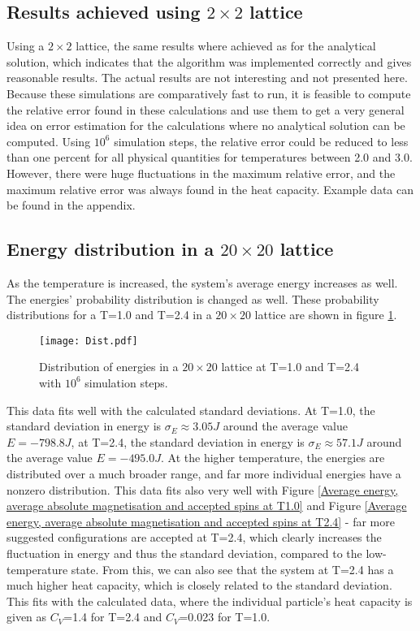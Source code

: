 \documentclass[10pt,a4paper]{article}
\begin{document}
\subsection{Results achieved using $2\times2$ lattice}
Using a $2\times2$ lattice, the same results where achieved as for the analytical solution, which indicates that the algorithm was implemented correctly and gives reasonable results. The actual results are not interesting and not presented here. Because these simulations are comparatively fast to run, it is feasible to compute the relative error found in these calculations and use them to get a very general idea on error estimation for the calculations where no analytical solution can be computed.
Using $10^6$ simulation steps, the relative error could be reduced to less than one percent for all physical quantities for temperatures between 2.0 and 3.0. However, there were huge fluctuations in the maximum relative error, and the maximum relative error was always found in the heat capacity. Example data can be found in the appendix.
\subsection{Energy distribution in a $20\times20$ lattice}
As the temperature is increased, the system's average energy increases as well. The energies' probability distribution is changed as well. These probability distributions for a T=1.0 and T=2.4 in a $20\times20$ lattice are shown in figure \ref{Energy probability distributions in a 20x20 lattice at T1.0  T2.4}.
\begin{figure}[H]
\texttt{[image: Dist.pdf]}
\caption[Energy probability distributions in a $20\times20$ lattice at T=1.0 \& T=2.4]{Distribution of energies in a $20\times20$ lattice at T=1.0 and T=2.4 with $10^6$ simulation steps.}\label{Energy probability distributions in a 20x20 lattice at T1.0  T2.4}
\end{figure}
This data fits well with the calculated standard deviations. At T=1.0, the standard deviation in energy is $\sigma_E\approx3.05J$ around the average value $E=-798.8J$, at T=2.4, the standard deviation in energy is $\sigma_E\approx57.1J$ around the average value $E=-495.0J$. At the higher temperature, the energies are distributed over a much broader range, and far more individual energies have a nonzero distribution. This data fits also very well with Figure \ref{Average energy, average absolute magnetisation and accepted spins at T1.0} and Figure \ref{Average energy, average absolute magnetisation and accepted spins at T2.4} - far more suggested configurations are accepted at T=2.4, which clearly increases the fluctuation in energy and thus the standard deviation, compared to the low-temperature state. From this, we can also see that the system at T=2.4 has a much higher heat capacity, which is closely related to the standard deviation. This fits with the calculated data, where the individual particle's heat capacity is given as $C_V$=1.4 for T=2.4 and $C_V$=0.023 for T=1.0. 
\end{document}
